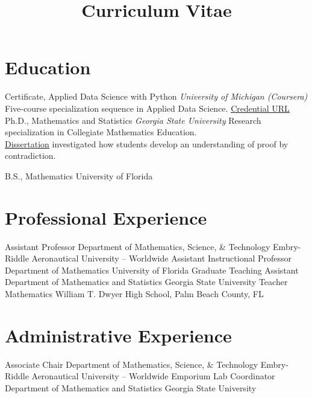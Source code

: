 \documentclass[10pt,a4paper,sans]{moderncv}
\title{Curriculum Vitae}
\begin{document}
\makecvtitle
\vspace*{-2cm}
\section{Education}
{Certificate, Applied Data Science with Python}
{}{}
{\textit{University of Michigan (Coursera)}}
{ Five-course specialization sequence in Applied Data Science. 
	\href{https://www.coursera.org/account/accomplishments/specialization/certificate/7TEVNZ89JDDA}{\underline{Credential URL}}  
}
{}
	{Ph.D., Mathematics and Statistics}
	{}{}
	{\textit{Georgia State University}}
	{ Research specialization in Collegiate Mathematics Education. \\ 
	\href{https://scholarworks.gsu.edu/math_diss/46/}{\underline{Dissertation}} investigated how students develop an understanding of proof by contradiction. 
	}
	{}
	
	{B.S., Mathematics}
	{University of Florida}
	{}{}{}
\section{Professional Experience}
	{Assistant Professor}
	{}
	{Department of Mathematics, Science, \& Technology}
	{Embry-Riddle Aeronautical University -- Worldwide}
	{}
	{Assistant Instructional Professor}
	{}
	{Department of Mathematics}
	{University of Florida}
	{}
	{Graduate Teaching Assistant}
	{}
	{Department of Mathematics and Statistics}
	{Georgia State University}
	{}
	{Teacher}
	{}
	{Mathematics}
	{William T. Dwyer High School, Palm Beach County, FL}
	{} 
\section{Administrative Experience}
	{Associate Chair}
	{}
	{Department of Mathematics, Science, \& Technology}
	{Embry-Riddle Aeronautical University -- Worldwide}
	{}
	{Emporium Lab Coordinator}
	{}
	{Department of Mathematics and Statistics}
	{Georgia State University}
	{}
\end{document}
